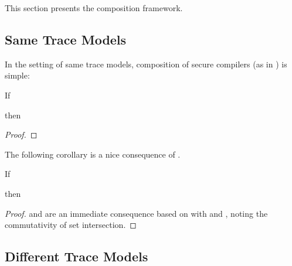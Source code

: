 \documentclass[a4paper,12pt]{article}
\begin{document}
This section presents the composition framework.

\subsection{Same Trace Models}\label{subsec:rtpc-same-trace-models}

In the setting of same trace models, composition of secure compilers (as in ) is simple:

\begin{lemma}[\Coqed]{}
  If 
  \begin{assumptions}
  \end{assumptions}
  then
  \begin{goals}
  \end{goals}
\end{lemma}
\begin{proof}
  \incompleteProof
\end{proof}
The following corollary is a nice consequence of .
\begin{corollary}[\Coqed]{}
  If 
  \begin{assumptions}
  \end{assumptions}
  then
  \begin{goals}
  \end{goals}
\end{corollary}
\begin{proof}
   and  are an immediate consequence based on  with  and , noting the commutativity of set intersection.
\end{proof}

\subsection{Different Trace Models}\label{subsec:rtpc-different-trace-models}
\end{document}
